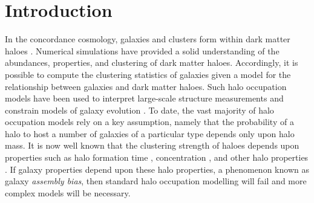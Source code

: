 \documentclass[usenatbib,fleqn]{mnras}
\begin{document}


\section{Introduction}
\label{section:introduction}

In the concordance cosmology, galaxies and clusters form within dark matter haloes \citep{white_rees78,blumenthal_etal84, mo_etal10}. Numerical simulations have provided a solid understanding of the abundances, properties, and clustering of dark matter haloes. Accordingly, it is possible to compute the clustering statistics of galaxies given a model for the relationship between galaxies and dark matter haloes. Such halo occupation models have been used to interpret large-scale structure measurements and constrain models of galaxy evolution \citep{yang_etal03,tinker_etal05,zehavi_etal05b,porciani_norberg06,vdbosch_etal07,zheng_etal07,conroy_wechsler09,yang_etal09b,zehavi_etal11,guo_etal11a,wake_etal11,yang_etal11a,yang_etal12,leauthaud_etal12,rodriguezpuebla_etal12, behroozi_etal13b, moster_etal13, tinker_etal13,cacciato_etal13,more_etal13,guo_etal14,zu_mandelbaum15b}. To date, the vast majority of halo occupation models rely on a key assumption, namely that the probability of a halo to host a number of galaxies of a particular type depends only upon halo mass. It is now well known that the clustering strength of haloes depends upon properties such as halo formation time \citep{gao_etal05,harker_etal06,wechsler_etal06,gao_white07,croton_etal07,zentner07,dalal_etal08, li_etal08, lacerna_padilla11}, concentration \citep{wechsler_etal06,faltenbacher_white10}, and other halo properties \citep{bett_etal07, hahn_etal07a, hahn_etal07b, faltenbacher_white10, vandaalen_etal12, fisher_faltenbacher16, sunayama_etal16, chavesmontero_etal16}. If galaxy properties depend upon these halo properties, a phenomenon known as galaxy {\em assembly bias}, then standard halo occupation modelling will fail \citep{zentner_etal14} and more complex models \citep{gilmarin_etal11, hearin_etal16} will be necessary.
\end{document}
